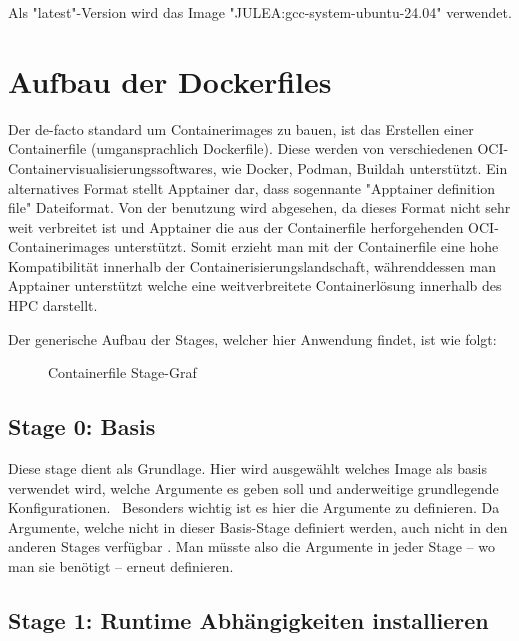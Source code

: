 Als "latest"-Version wird das Image "JULEA:gcc-system-ubuntu-24.04" verwendet. 

\section{Aufbau der Dockerfiles}

Der de-facto standard um Containerimages zu bauen, ist das Erstellen einer Containerfile (umgansprachlich Dockerfile). Diese werden von verschiedenen OCI-Containervisualisierungssoftwares, wie Docker, Podman, Buildah unterstützt. Ein alternatives Format stellt Apptainer dar, dass sogennante "Apptainer definition file" Dateiformat. Von der benutzung wird abgesehen, da dieses Format nicht sehr weit verbreitet ist und Apptainer die aus der Containerfile herforgehenden OCI-Containerimages unterstützt. Somit erzieht man mit der Containerfile eine hohe Kompatibilität innerhalb der Containerisierungslandschaft, währenddessen man Apptainer unterstützt welche eine weitverbreitete Containerlösung innerhalb des HPC darstellt.

Der generische Aufbau der Stages, welcher hier Anwendung findet, ist wie folgt: 

\begin{figure}[!htbp]
    \centering
    
    \caption{Containerfile Stage-Graf}
\end{figure}

\FloatBarrier

\subsection{Stage 0: Basis}

Diese stage dient als Grundlage. Hier wird ausgewählt welches Image als basis verwendet wird, welche Argumente es geben soll und anderweitige grundlegende Konfigurationen. \
Besonders wichtig ist es hier die Argumente zu definieren. Da Argumente, welche nicht in dieser Basis-Stage definiert werden, auch nicht in den anderen Stages verfügbar \cite[Vgl. "Understand how ARG and FROM interact"]{DockerfileReference0100}. Man müsste also die Argumente in jeder Stage – wo man sie benötigt – erneut definieren.  


\subsection{Stage 1: Runtime Abhängigkeiten installieren}

